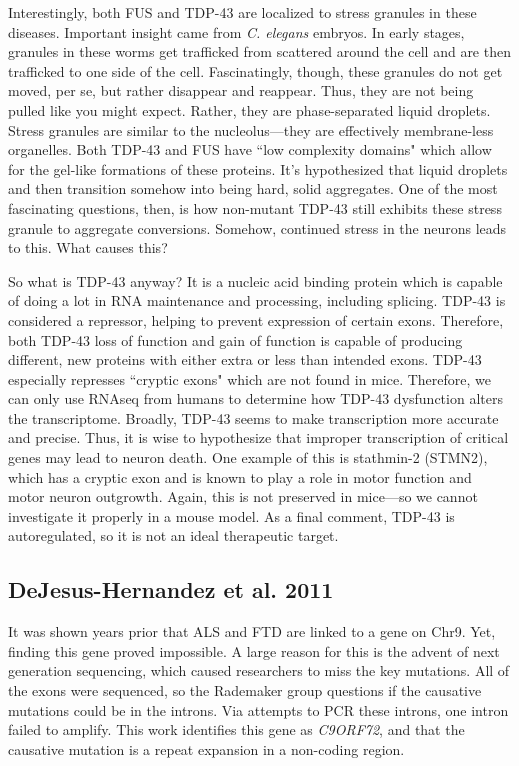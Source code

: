 \documentclass[12pt]{report}
\begin{document}
Interestingly, both FUS and TDP-43 are localized to stress granules in these diseases. Important insight came from \textit{C. elegans} embryos. In early stages, granules in these worms get trafficked from scattered around the cell and are then trafficked to one side of the cell. Fascinatingly, though, these granules do not get moved, per se, but rather disappear and reappear. Thus, they are not being pulled like you might expect. Rather, they are phase-separated liquid droplets. Stress granules are similar to the nucleolus---they are effectively membrane-less organelles. Both TDP-43 and FUS have ``low complexity domains" which allow for the gel-like formations of these proteins. It's hypothesized that liquid droplets and then transition somehow into being hard, solid aggregates. One of the most fascinating questions, then, is how non-mutant TDP-43 still exhibits these stress granule to aggregate conversions. Somehow, continued stress in the neurons leads to this. What causes this?\newline

So what is TDP-43 anyway? It is  a nucleic acid binding protein which is capable of doing a lot in RNA maintenance and processing, including splicing. TDP-43 is considered a repressor, helping to prevent expression of certain exons. Therefore, both TDP-43 loss of function and gain of function is capable of producing different, new proteins with either extra or less than intended exons. TDP-43 especially represses ``cryptic exons" which are not found in mice. Therefore, we can only use RNAseq from humans to determine how TDP-43 dysfunction alters the transcriptome. Broadly, TDP-43 seems to make transcription more accurate and precise. Thus, it is wise to hypothesize that improper transcription of critical genes may lead to neuron death. One example of this is stathmin-2 (STMN2), which has a cryptic exon and is known to play a role in motor function and motor neuron outgrowth. Again, this is not preserved in mice---so we cannot investigate it properly in a mouse model. As a final comment, TDP-43 is autoregulated, so it is not an ideal therapeutic target. 


\subsection{DeJesus-Hernandez et al. 2011}

It was shown years prior that ALS and FTD are linked to a gene on Chr9. Yet, finding this gene proved impossible. A large reason for this is the advent of next generation sequencing, which caused researchers to miss the key mutations. All of the exons were sequenced, so the Rademaker group questions if the causative mutations could be in the introns. Via attempts to PCR these introns, one intron failed to amplify. This work identifies this gene as \textit{C9ORF72}, and that the causative mutation is a repeat expansion in a non-coding region. 
\end{document}
